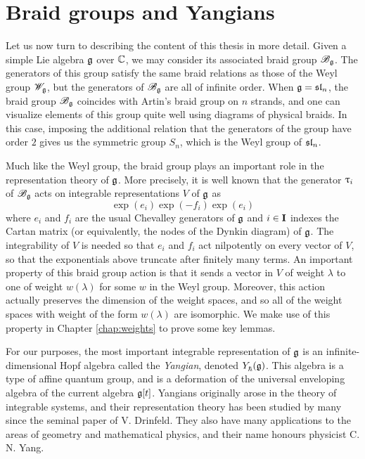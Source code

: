 \section{Braid groups and Yangians}

Let us now turn to describing the content of this thesis in more detail.
Given a simple Lie algebra $\mathfrak{g}$ over $\mathbb{C}$, we may consider its associated braid group $\mathscr{B}_{\mathfrak{g}}$.
The generators of this group satisfy the same braid relations as those of the Weyl group $\mathscr{W}_{\mathfrak{g}}$, but the generators of $\mathscr{B}_{\mathfrak{g}}$ are all of infinite order.
When $\mathfrak{g} = \mathfrak{sl}_n$, the braid group $\mathscr{B}_{\mathfrak{g}}$ coincides with Artin's braid group on $n$ strands, and one can visualize elements of this group quite well using diagrams of physical braids.
In this case, imposing the additional relation that the generators of the group have order $2$ gives us the symmetric group $S_n$, which is the Weyl group of $\mathfrak{sl}_n$.

Much like the Weyl group, the braid group plays an important role in the representation theory of $\mathfrak{g}$.
More precisely, it is well known that the generator $\uptau_i$ of $\mathscr{B}_{\mathfrak{g}}$ acts on integrable representations $V$ of $\mathfrak{g}$ as
\[\exp(e_i)\exp(-f_i)\exp(e_i)\]
where $e_i$ and $f_i$ are the usual Chevalley generators of $\mathfrak{g}$ and $i\in\mathbf{I}$ indexes the Cartan matrix (or equivalently, the nodes of the Dynkin diagram) of $\mathfrak{g}$.
The integrability of $V$ is needed so that $e_i$ and $f_i$ act nilpotently on every vector of $V$, so that the exponentials above truncate after finitely many terms.
An important property of this braid group action is that it sends a vector in $V$ of weight $\lambda$ to one of weight $w(\lambda)$ for some $w$ in the Weyl group.
Moreover, this action actually preserves the dimension of the weight spaces, and so all of the weight spaces with weight of the form $w(\lambda)$ are isomorphic.
We make use of this property in Chapter \ref{chap:weights} to prove some key lemmas.

For our purposes, the most important integrable representation of $\mathfrak{g}$ is an infinite-dimensional Hopf algebra called the \emph{Yangian}, denoted $Y_\hbar^{}(\mathfrak{g})$.
This algebra is a type of affine quantum group, and is a deformation of the universal enveloping algebra of the current algebra $\mathfrak{g}[t]$.
Yangians originally arose in the theory of integrable systems, and their representation theory has been studied by many since the seminal paper \cite{drinfeld_hopf_1985} of V. Drinfeld.
They also have many applications to the areas of geometry and mathematical physics, and their name honours physicist C. N. Yang.

